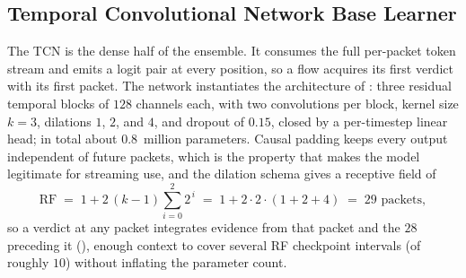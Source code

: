 \subsection{Temporal Convolutional Network Base Learner}\label{subsec:sol-tcn}
The \ac{TCN} is the dense half of the ensemble. It consumes the full per-packet token
stream and emits a logit pair at every position, so a flow acquires its first verdict
with its first packet. The network instantiates the architecture of
: three residual temporal blocks of $128$ channels each,
with two convolutions per block, kernel size $k = 3$, dilations $1$, $2$, and $4$, and
dropout of $0.15$, closed by a per-timestep linear head; in total about $0.8$~million
parameters. Causal padding keeps every output independent of future packets, which is
the property that makes the model legitimate for streaming use, and the dilation schema
gives a receptive field of
\begin{equation}
    \mathrm{RF} \;=\; 1 + 2\,(k-1)\sum_{i=0}^{2} 2^{\,i}
              \;=\; 1 + 2\cdot 2\cdot(1+2+4) \;=\; 29 \text{ packets},
    \label{eq:bg-rf}
\end{equation}
so a verdict at any packet integrates evidence from that packet and the $28$ preceding it
(), enough context to cover several \ac{RF} checkpoint intervals (of
roughly $10$) without inflating the parameter count.

